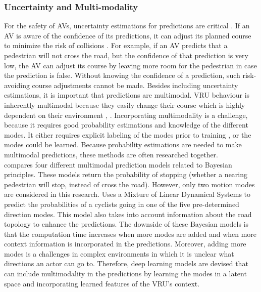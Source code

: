 \subsubsection{Uncertainty and Multi-modality}
For the safety of AVs, uncertainty estimations for predictions are critical \cite{djuric2020uncertainty}. If an AV is aware of the confidence of its predictions, it can adjust its planned course to minimize the risk of collisions \cite{huang2019uncertainty}. For example, if an AV predicts that a pedestrian will not cross the road, but the confidence of that prediction is very low, the AV can adjust its course by leaving more room for the pedestrian in case the prediction is false. Without knowing the confidence of a prediction, such risk-avoiding course adjustments cannot be made. Besides including uncertainty estimations, it is important that predictions are multimodal. VRU behaviour is inherently multimodal because they easily change their course which is highly dependent on their environment \cite{cui2019multimodal}, \cite{tang2019multiple}. Incorporating multimodality is a challenge, because it requires good probability estimations and knowledge of the different modes. It either requires explicit labeling of the modes prior to training \cite{tang2019multiple}, or the modes could be learned. Because probability estimations are needed to make multimodal predictions, these methods are often researched together. \\
\cite{keller2013will} compares four different multimodal prediction models related to Bayesian principles. These models return the probability of stopping (whether a nearing pedestrian will stop, instead of cross the road). However, only two motion modes are considered in this research. \cite{pool2017using} Uses a Mixture of Linear Dynamical Systems to predict the probabilities of a cyclists going in one of the five pre-determined direction modes. This model also takes into account information about the road topology to enhance the predictions. The downside of these Bayesian models is that the computation time increases when more modes are added and when more context information is incorporated in the predictions. Moreover, adding more modes is a challenges in complex environments in which it is unclear what directions an actor can go to. Therefore, deep learning models are devised that can include multimodality in the predictions by learning the modes in a latent space and incorporating learned features of the VRU's context. \\
